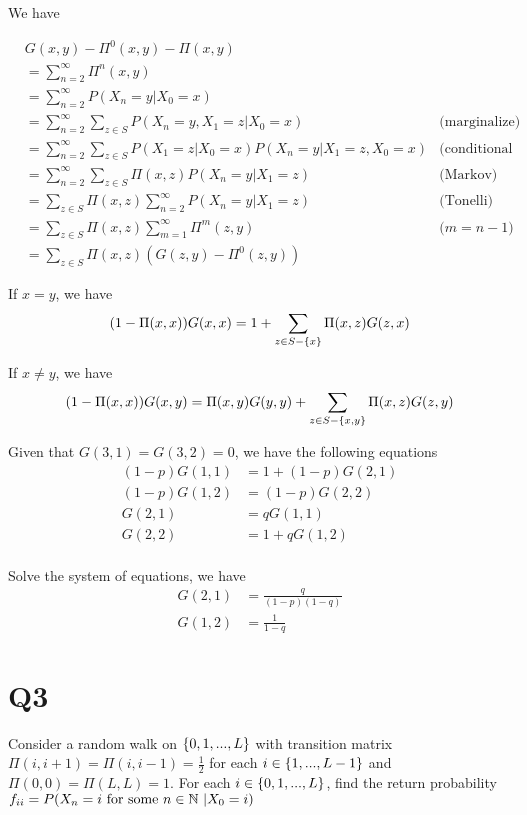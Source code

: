 \documentclass{article}
\begin{document}
We have

\begin{align*}
    &G(x, y) - \Pi^0(x, y) - \Pi(x, y) \\
    &=\sum_{n=2}^\infty \Pi^n(x, y) \\
    &= \sum_{n=2}^\infty P(X_n=y | X_0=x) \\
    &= \sum_{n=2}^\infty \sum_{z \in S} P(X_n=y, X_1 = z| X_0=x) &\text{(marginalize)}\\
    &= \sum_{n=2}^\infty \sum_{z \in S} P(X_1 = z| X_0=x) P(X_n=y | X_1 = z, X_0=x) &\text{(conditional probability)}\\
    &= \sum_{n=2}^\infty \sum_{z \in S} \Pi(x, z) P(X_n=y | X_1 = z) &\text{(Markov)}\\
    &= \sum_{z \in S} \Pi(x, z) \sum_{n=2}^\infty P(X_n=y | X_1 = z) &\text{(Tonelli)}\\
    &= \sum_{z \in S} \Pi(x, z) \sum_{m=1}^\infty \Pi^{m}(z, y) &\text{($m = n-1$)}\\
    &= \sum_{z \in S} \Pi(x, z) (G(z, y) - \Pi^0(z, y))
\end{align*}

If $x = y$, we have
$$
    (1 - \Pi(x, x)) G(x, x) =  1 + \sum_{z \in S - \{x\}} \Pi(x, z) G(z, x)
$$

If $x \neq y$, we have
$$
    (1 - \Pi(x, x)) G(x, y) =  \Pi(x, y) G(y, y) + \sum_{z \in S - \{x, y\}} \Pi(x, z) G(z, y)
$$


Given that $G(3, 1) = G(3, 2) = 0$, we have the following equations
\begin{align*}
    (1 - p) G(1, 1) &= 1 + (1-p) G(2, 1) \\
    (1 - p) G(1, 2) &= (1-p) G(2, 2) \\
    G(2, 1) &= q G(1, 1) \\
    G(2, 2) &= 1 + q G(1, 2) \\
\end{align*}

Solve the system of equations, we have
\begin{align*}
    G(2, 1) &= \frac{q}{(1-p)(1-q)} \\
    G(1, 2) &= \frac{1}{1-q}
\end{align*}

\section{Q3}

Consider a random walk on $\{0, 1, ..., L\}$ with transition matrix $\Pi(i, i + 1) = \Pi(i, i - 1) = \frac{1}{2}$ for each $i \in \{1, ..., L-1\}$ and $\Pi(0, 0) = \Pi(L, L) = 1$. For each $i \in \{0, 1, ..., L\}$, find the return probability $f_{ii} = P(X_n = i \text{ for some $n \in \mathbb{N}$ } | X_0 = i)$
\end{document}
